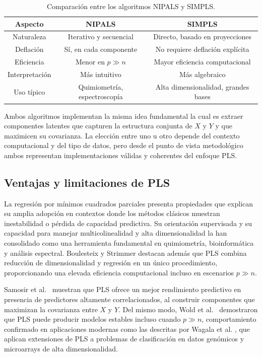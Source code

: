 \documentclass[12pt,a4paper]{report}
\begin{document}
\begin{table}[H]
\centering
\small
\caption{Comparación entre los algoritmos NIPALS y SIMPLS.}
\label{tabla:nipals_simpls}
\begin{tabular}{|c|c|c|}
\hline
\textbf{Aspecto} & \textbf{NIPALS} & \textbf{SIMPLS} \\
\hline \hline
Naturaleza & Iterativo y secuencial & Directo, basado en proyecciones \\ \hline
Deflación & Sí, en cada componente & No requiere deflación explícita \\ \hline
Eficiencia & Menor en \(p \gg n\) & Mayor eficiencia computacional \\ \hline
Interpretación & Más intuitivo & Más algebraico \\ \hline
Uso típico & Quimiometría, espectroscopía & Alta dimensionalidad, grandes bases \\ \hline
\end{tabular}

\end{table}


Ambos algoritmos implementan la misma idea fundamental la cual es extraer componentes latentes que capturen la estructura conjunta de \(X\) y \(Y\) y que maximicen su covarianza. La elección entre uno u otro depende del contexto computacional y del tipo de datos, pero desde el punto de vista metodológico ambos representan implementaciones válidas y coherentes del enfoque PLS.

\subsection{Ventajas y limitaciones de PLS}

La regresión por mínimos cuadrados parciales presenta propiedades que explican su amplia adopción en contextos donde los métodos clásicos muestran inestabilidad o pérdida de capacidad predictiva. Su orientación supervisada y su capacidad para manejar multicolinealidad y alta dimensionalidad la han consolidado como una herramienta fundamental en quimiometría, bioinformática y análisis espectral. Boulesteix y Strimmer \cite{boulesteix2007} destacan además que PLS combina reducción de dimensionalidad y regresión en un único procedimiento, proporcionando una elevada eficiencia computacional incluso en escenarios \(p \gg n\).

Samosir et al.\ \cite{samosir2022} muestran que PLS ofrece un mejor rendimiento predictivo en presencia de predictores altamente correlacionados, al construir componentes que maximizan la covarianza entre \(X\) y \(Y\). Del mismo modo, Wold et al.\ \cite{wold2001} demostraron que PLS puede producir modelos estables incluso cuando \(p \gg n\), comportamiento confirmado en aplicaciones modernas como las descritas por Wagala et al. \cite{wagala2020}, que aplican extensiones de PLS a problemas de clasificación en datos genómicos y microarrays de alta dimensionalidad.
\end{document}

